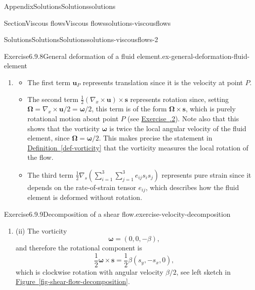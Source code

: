 \documentclass[oneside,10pt,]{book}
\newcommand{\xreffont}{\relax}
\newcommand{\ptxlistdisc}{\raisebox{0.3ex}{\textbullet}}
\numberwithin{equation}{section}
\newcommand{\pd}[2]{\frac{\partial#1}{\partial#2}}
\newcommand{\bs}{\boldsymbol{s}}
\newcommand{\bu}{\boldsymbol{u}}
\newcommand{\bomega}{\boldsymbol{\omega}}
\newcommand{\bOmega}{\boldsymbol{\Omega}}
\begin{document}
\begin{appendixptx}{Appendix}{Solutions}{}{Solutions}{}{}{solutions}
\begin{sectionptx}{Section}{Viscous flows}{}{Viscous flows}{}{}{solutions-viscousflows}
\begin{solutions-subsection-numberless}{Solutions}{Solutions}{}{Solutions}{}{}{solutions-viscousflows-2}
\begin{divisionsolution}{Exercise}{6.9.8}{General deformation of a fluid element.}{ex-general-deformation-fluid-element}
\begin{enumerate}[font=\bfseries,label=(\alph*),ref=\alph*]
\begin{align*}
=&\frac12\sum_{i=1}^3\left(\pd{u_k}{x_i}-\pd{u_i}{x_k}\right)s_i
+\frac12\sum_{i=1}^3\left(\pd{u_i}{x_k}+\pd{u_k}{x_i}\right)s_i\\
=&\sum_{i=1}^3\pd{u_k}{x_i}s_i,
\end{align*}
which is the \(k\)th component of \((\bs\cdot\nabla)\bu\), thus proving the result.%
\item[(c)]\noindent\hypertarget{ex-general-deformation-fluid-element-5-2-main}{}%
\begin{itemize}[label=\ptxlistdisc]
\item{}The first term \(\bu_P\) represents translation since it is the velocity at point \(P\).%
\item{}The second term \(\frac12(\nabla_x\times\bu)\times\bs\) represents rotation since, setting \(\bOmega=\nabla_x\times\bu/2=\bomega/2\), this term is of the form \(\bOmega\times\bs\), which is purely rotational motion about point \(P\) (see \hyperlink{ex-rotating-flow}{Exercise~{\xreffont 6.10.2}}). Note also that this shows that the vorticity \(\bomega\) is twice the local angular velocity of the fluid element, since \(\bOmega=\bomega/2\). This makes precise the statement in \hyperref[def-vorticity]{Definition~{\xreffont\ref{def-vorticity}}} that the vorticity measures the local rotation of the flow.%
\item{}The third term \(\frac12\nabla_s(\sum_{i=1}^3\sum_{j=1}^3e_{ij}s_is_j)\) represents pure strain since it depends on the rate-of-strain tensor \(e_{ij}\), which describes how the fluid element is deformed without rotation.%
\end{itemize}
%
\end{enumerate}%
\end{divisionsolution}%
\begin{divisionsolution}{Exercise}{6.9.9}{Decomposition of a shear flow.}{exercise-velocity-decomposition}%
\begin{enumerate}[font=\bfseries,label=(\alph*),ref=\alph*]%
\item[(a)]\noindent\hypertarget{exercise-velocity-decomposition-3-2-main}{}(ii) The vorticity%
\begin{equation*}
\bomega=(0,0,-\beta),
\end{equation*}
and therefore the rotational component is%
\begin{equation*}
\frac12\bomega\times\bs
=\frac12\beta(s_y,-s_x,0),
\end{equation*}
which is clockwise rotation with angular velocity \(\beta/2\), see left sketch in \hyperref[fig-shear-flow-decomposition]{Figure~{\xreffont\ref{fig-shear-flow-decomposition}}}.%

\end{enumerate}
\end{divisionsolution}
\end{solutions-subsection-numberless}
\end{sectionptx}
\end{appendixptx}
\end{document}
